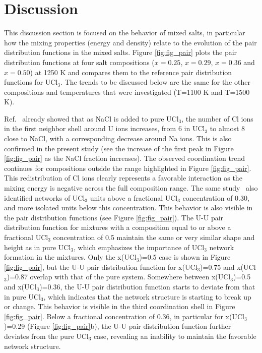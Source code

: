 \documentclass[preprint,3p,10pt,onecolumn,number,sort&compress]{elsarticle}
\begin{document}
{\FloatBarrier

\section{Discussion}
\label{sec:discussion}
This discussion section is focused on the behavior of mixed salts, in particular how the mixing properties (energy and density) relate to the evolution of the pair distribution functions in the mixed salts. Figure \ref{fig:fig_pair} plots the pair distribution functions at four salt compositions ($x=0.25$, $x=0.29$, $x=0.36$ and $x=0.50$) at 1250 K and compares them to the reference pair distribution functions for UCl$_3$. The trends to be discussed below are the same for the other compositions and temperatures that were investigated (T=1100 K and T=1500 K).

Ref.~\cite{Li} already showed that as NaCl is added to pure UCl$_3$, the number of Cl ions in the first neighbor shell around U ions increases, from 6 in UCl$_3$ to almost 8 close to NaCl, with a corresponding decrease around Na ions. This is also confirmed in the present study (see the increase of the first peak in Figure \ref{fig:fig_pair} as the NaCl fraction increases). The observed coordination trend continues for compositions outside the range highlighted in Figure \ref{fig:fig_pair}.
  This redistribution of Cl ions clearly represents a favorable interaction as the mixing energy is negative across the full composition range. The same study~\cite{Li} also identified networks of UCl$_3$ units above a fractional UCl$_3$ concentration of 0.30, and more isolated units below this concentration. This behavior is also visible in the pair distribution functions (see Figure \ref{fig:fig_pair}). The U-U pair distribution function for mixtures with a composition equal to or above a fractional UCl$_3$ concentration of 0.5 maintain the same or very similar shape and height as in pure UCl$_3$, which emphasizes the importance of UCl$_3$ network formation in the mixtures. Only the x(UCl$_3$)=0.5 case is shown in Figure \ref{fig:fig_pair}, but the U-U pair distribution function for x(UCl$_3$)=0.75 and x(UCl$_3$)=0.87 overlap with that of the pure system. Somewhere between x(UCl$_3$)=0.5 and x(UCl$_3$)=0.36, the U-U pair distribution function starts to deviate from that in pure UCl$_3$, which indicates that the network structure is starting to break up or change. This behavior is visible in the third coordination shell in Figure \ref{fig:fig_pair}.
Below a fractional concentration of 0.36, in particular for x(UCl$_3$)=0.29 (Figure \ref{fig:fig_pair}b), the U-U pair distribution function further deviates from the pure UCl$_3$ case, revealing an inability to maintain the favorable network structure. %
}
\end{document}
